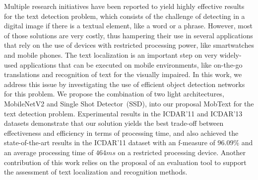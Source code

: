 Multiple research initiatives have been reported to yield highly effective results for the text detection problem, which consists of the challenge of detecting in a digital image if there is a textual element, like a word or a phrase. However, most of those solutions are very costly, thus hampering their use in several applications that rely on the use of devices with restricted processing power, like smartwatches and mobile phones. The text localization is an important step on very widely-used  applications that can be executed on mobile environments, like on-the-go translations and recognition of text for the visually impaired. In this work, we address this issue by investigating the use of efficient object detection networks for this problem. We propose the combination of two light architectures, MobileNetV2 and Single Shot Detector~(SSD), into our proposal MobText for the text detection problem. %
Experimental results in the ICDAR'11 and ICDAR'13 datasets demonstrate that our solution yields the best trade-off between effectiveness and efficiency in terms of processing time, and also achieved the state-of-the-art results in the ICDAR'11 dataset with an f-measure of $96.09\%$ and an average processing time of $464 ms$ on a restricted processing device.  Another contribution of this work relies on the proposal of an evaluation tool to support the assessment of text localization and recognition methods.
